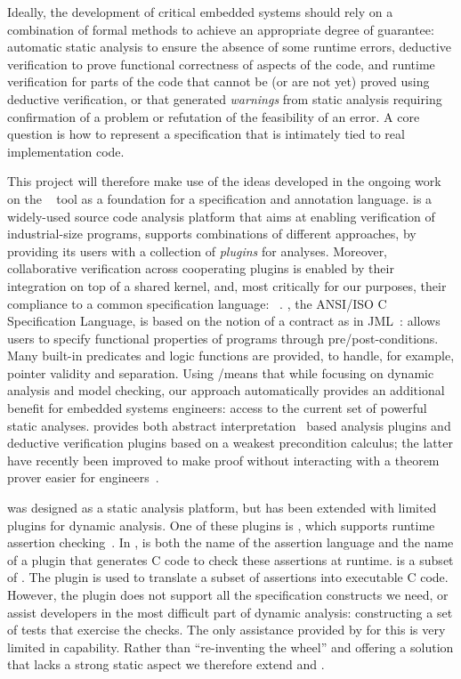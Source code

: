 Ideally, the development of critical embedded systems should rely on a combination of formal methods to achieve an appropriate degree of guarantee:
automatic static analysis to ensure the absence of some runtime errors,
deductive verification to prove functional correctness of aspects of the code,
and runtime verification for parts of the code that cannot be (or are not yet) proved using deductive verification,
or that generated \emph{warnings} from static analysis requiring confirmation of a problem or refutation of the feasibility of an error.  A core question is how to represent a specification that is intimately tied to real implementation code.  

This project will therefore make use of the ideas developed in the ongoing work on the \framac{}~\cite{KKP2015:FAC} tool as a foundation for a specification and annotation language.
\framac is a widely-used source code analysis platform that aims at enabling verification of industrial-size programs,
 supports combinations of different approaches, by providing its users with a collection of \emph{plugins} for analyses.
Moreover, collaborative verification across cooperating plugins is enabled by their integration on top of a shared kernel, and, most critically for our purposes, their compliance to a common specification language: \acsl~\cite{ACSL}.
\acsl, the ANSI/ISO C Specification Language, is based on the notion of a contract as in JML~\cite{jml}: \acsl allows users to specify functional properties of programs through pre/post-conditions.
Many built-in predicates and logic functions are provided, to handle, for example, pointer validity and separation.
Using \acsl/\framac means that while focusing on dynamic analysis and model checking, our approach automatically provides an additional benefit for embedded systems engineers: access to the current set of powerful \framac static analyses.  \framac provides both abstract interpretation~\cite{cousot77} based analysis plugins and deductive verification plugins based on a weakest precondition calculus; the latter have recently been improved to make proof without interacting with a theorem prover easier for engineers~\cite{BLK2019:NFM}.

\framac was designed as a static analysis platform, but has been extended with limited plugins for dynamic analysis.
One of these plugins is \eacsl, which supports runtime assertion checking~\cite{CR2006:SEN}.
In \framac, \eacsl is both the name of the assertion language and the name of a plugin that generates C code to check these assertions at runtime.
\eacsl is a subset of \acsl.  The plugin \eacsl is used to translate a subset of \framac assertions into executable C code.
However, the \eacsl plugin does not support all the specification constructs we need, or assist developers in the most difficult part of dynamic analysis:  constructing a set of tests that exercise the checks.  The only assistance provided by \framac for this is very limited in capability.  Rather than ``re-inventing the wheel'' and offering a solution that lacks a strong static aspect we therefore extend \acsl and \eacsl.
